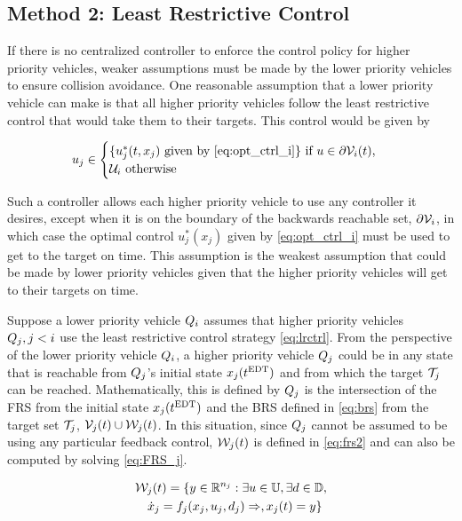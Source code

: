 \subsection{Method 2: Least Restrictive Control \label{sec:lrc}}
If there is no centralized controller to enforce the control policy for higher priority vehicles, weaker assumptions must be made by the lower priority vehicles to ensure collision avoidance. One reasonable assumption that a lower priority vehicle can make is that all higher priority vehicles follow the least restrictive control that would take them to their targets. This control would be given by 

\begin{equation}
\label{eq:lrctrl} %
u_j \in \begin{cases} \{u_j^*(t, x_j) \text{ given by } \eqref{eq:opt_ctrl_i}\} \text{ if } u\in \partial \brs_i(t), \\
\cset_i  \text{ otherwise}
\end{cases}
\end{equation}

Such a controller allows each higher priority vehicle to use any controller it desires, except when it is on the boundary of the backwards reachable set, $\partial \mathcal{V}_i$, in which case the optimal control $u_j^*(x_j)$ given by \eqref{eq:opt_ctrl_i} must be used to get to the target on time. This assumption is the weakest assumption that could be made by lower priority vehicles given that the higher priority vehicles will get to their targets on time.

Suppose a lower priority vehicle $Q_i$ assumes that higher priority vehicles $Q_j, j < i$ use the least restrictive control strategy \eqref{eq:lrctrl}. From the perspective of the lower priority vehicle $Q_i$, a higher priority vehicle $Q_j$ could be in any state that is reachable from $Q_j$'s initial state $x_j(t^\text{EDT})$ and from which the target $\mathcal{T}_j$ can be reached. Mathematically, this is defined by $Q_j$ is the intersection of the FRS from the initial state $x_j(t^\text{EDT})$ and the BRS defined in \eqref{eq:brs} from the target set $\mathcal{T}_j$, $\mathcal{V}_j(t) \cup \mathcal{W}_j(t)$. In this situation, since $Q_j$ cannot be assumed to be using any particular feedback control, $\mathcal{W}_j(t)$ is defined in \eqref{eq:frs2} and can also be computed by solving \eqref{eq:FRS_j}.

\begin{equation}
\label{eq:frs2}
\begin{aligned}
&\mathcal{W}_j(t) = \{y \in \mathbb{R}^{n_j}: \exists u \in \mathbb{U}, \exists d \in \mathbb{D}, \\
& \quad \dot{x}_j = f_j(x_j, u_j, d_j) \Rightarrow, x_j(t) = y\}
\end{aligned}
\end{equation}

